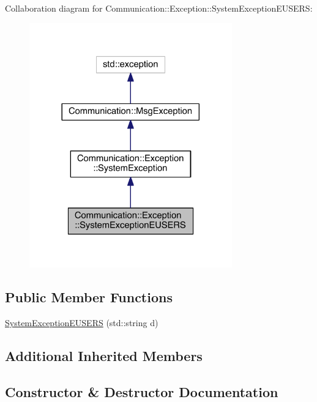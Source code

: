 Collaboration diagram for Communication\+:\+:Exception\+:\+:System\+Exception\+E\+U\+S\+E\+R\+S\+:\nopagebreak
\begin{figure}[H]
\begin{center}
\leavevmode
\includegraphics[width=248pt]{class_communication_1_1_exception_1_1_system_exception_e_u_s_e_r_s__coll__graph}
\end{center}
\end{figure}
\subsection*{Public Member Functions}
\begin{DoxyCompactItemize}
\item 
\hyperlink{class_communication_1_1_exception_1_1_system_exception_e_u_s_e_r_s_ac26f437ea8b2167732ce075dc84587be}{System\+Exception\+E\+U\+S\+E\+R\+S} (std\+::string d)
\end{DoxyCompactItemize}
\subsection*{Additional Inherited Members}


\subsection{Constructor \& Destructor Documentation}
\hypertarget{class_communication_1_1_exception_1_1_system_exception_e_u_s_e_r_s_ac26f437ea8b2167732ce075dc84587be}{}
